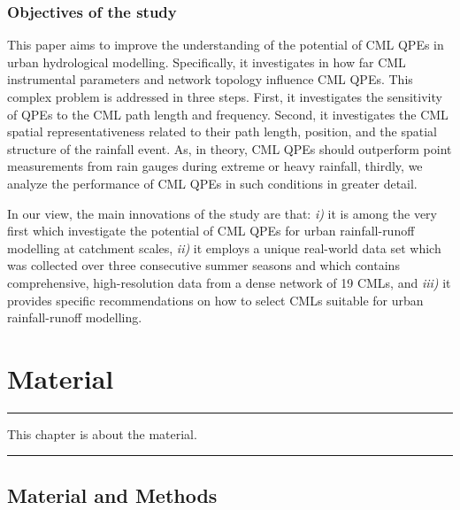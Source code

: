 \documentclass{ctuthesis}\usepackage[]{graphicx}\usepackage[]{color}
\begin{document}
\subsection{Objectives of the study}

This paper aims to improve the understanding of the potential of CML QPEs in urban hydrological modelling. Specifically, it investigates in how far CML instrumental parameters and network topology influence CML QPEs. This complex problem is addressed in three steps. First, it investigates the sensitivity of QPEs to the CML path length and frequency. Second, it investigates the CML spatial representativeness related to their path length, position, and the spatial structure of the rainfall event. As, in theory, CML QPEs should outperform point measurements from rain gauges during extreme or heavy rainfall, thirdly, we analyze the performance of CML QPEs in such conditions in greater detail. 

In our view, the main innovations of the study are that: \emph{i)} it is among the very first which investigate the potential of CML QPEs for urban rainfall-runoff modelling at catchment scales, \emph{ii)} it employs a unique real-world data set which was collected over three consecutive summer seasons and which contains comprehensive, high-resolution data from a dense network of 19 CMLs, and \emph{iii)} it provides specific recommendations on how to select CMLs suitable for urban rainfall-runoff modelling.





        
        


\chapter{Material} \label{chap2}

\rule{\textwidth}{0.4pt}
This chapter is about the material. \newline
\rule[0.2cm]{\textwidth}{0.4pt}



\section{Material and Methods}
\end{document}
